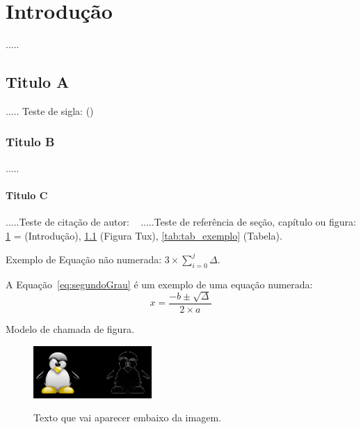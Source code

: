 \chapter{Introduç\~ao}\label{ch:intro}

.....

\section{Titulo A}\label{sec:tituloa}

..... Teste de sigla:
()

\subsection{Titulo B}\label{subsec:titulob}

.....

\subsubsection{Titulo C}\label{ssubsec:tituloc}

.....Teste de citaç\~ao de autor: ~\cite{Artero2009}
.....Teste de referência de seç\~ao, cap\'itulo ou figura: \ref{ch:intro} = (Introduç\~ao), \ref{fig:tux_laplace} (Figura Tux), \ref{tab:tab_exemplo} (Tabela).

Exemplo de Equação não numerada: $3 \times \sum_{i=0}^{j}\Delta$.

A Equação~\ref{eq:segundoGrau} é um exemplo de uma equação numerada:
\begin{equation}
x = \dfrac{-b \pm \sqrt{ \Delta}}{2 \times a}
\label{eq:segundoGrau}
\end{equation}





Modelo de chamada de figura.

\begin{figure}[htb]
	\centering
	\includegraphics[width=0.4\textwidth]{Cap1/imagens/tux_laplace.png} %
	\caption[Texto que vai aparecer na lista de fig.]{Texto que vai aparecer embaixo da imagem.}
	\label{fig:tux_laplace}
\end{figure}

